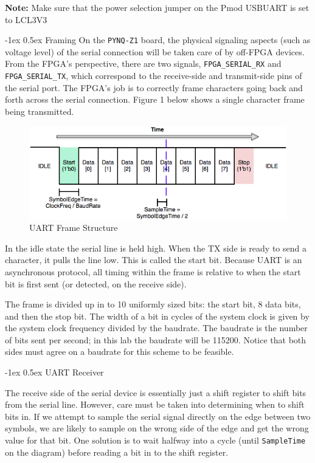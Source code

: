 \documentclass[11pt]{article}
\makeatletter
\renewcommand{\subsection}
{\@startsection {subsection}{1}{0pt}
 {-1ex}
 {0.5ex}
 {\bfseries\normalsize}}
\makeatother
\begin{document}
\textbf{Note:} Make sure that the power selection jumper on the Pmod USBUART is set to LCL3V3

\subsection{Framing}
On the \verb|PYNQ-Z1| board, the physical signaling aspects (such as voltage level) of the serial connection will be taken care of by off-FPGA devices.
From the FPGA's perspective, there are two signals, \verb|FPGA_SERIAL_RX| and \verb|FPGA_SERIAL_TX|, which correspond to the receive-side and transmit-side pins of the serial port.
The FPGA's job is to correctly frame characters going back and forth across the serial connection.
Figure 1 below shows a single character frame being transmitted.

\begin{figure}[H]
  \centerline{\includegraphics[width=6in]{figs/uart_frame.png}}
  \caption{UART Frame Structure}
\end{figure}

In the idle state the serial line is held high.
When the TX side is ready to send a character, it pulls the line low.
This is called the start bit.
Because UART is an asynchronous protocol, all timing within the frame is relative to when the start bit is first sent (or detected, on the receive side).

The frame is divided up in to 10 uniformly sized bits: the start bit, 8 data bits, and then the stop bit.
The width of a bit in cycles of the system clock is given by the system clock frequency divided by the baudrate.
The baudrate is the number of bits sent per second; in this lab the baudrate will be 115200.
Notice that both sides must agree on a baudrate for this scheme to be feasible.

\subsection{UART Receiver}

The receive side of the serial device is essentially just a shift register to shift bits from the serial line.
However, care must be taken into determining when to shift bits in.
If we attempt to sample the serial signal directly on the edge between two symbols, we are likely to sample on the wrong side of the edge and get the wrong value for that bit.
One solution is to wait halfway into a cycle (until \verb|SampleTime| on the diagram) before reading a bit in to the shift register.
\end{document}
